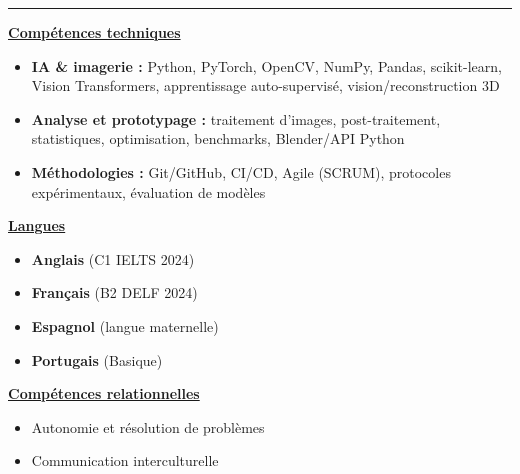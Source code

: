 \documentclass[letterpaper,10pt]{article}
\begin{document}
  

\vspace{4pt}
\noindent\rule{\textwidth}{0.4pt}
\vspace{0.4pt}

\noindent
\begin{minipage}[t]{0.39\textwidth}
  \raggedright
  \textbf{\underline{Compétences techniques}}\\[-2pt]
  {\scriptsize
    \begin{itemize}[leftmargin=*,itemsep=1pt,parsep=0pt,topsep=0pt,partopsep=0pt]
      \item \textbf{IA \& imagerie :} Python, PyTorch, OpenCV, NumPy, Pandas, scikit-learn, Vision Transformers, apprentissage auto-supervisé, vision/reconstruction 3D
      \item \textbf{Analyse et prototypage :} traitement d'images, post-traitement, statistiques, optimisation, benchmarks, Blender/API Python
      \item \textbf{Méthodologies :} Git/GitHub, CI/CD, Agile (SCRUM), protocoles expérimentaux, évaluation de modèles
    \end{itemize}
  }
\end{minipage}\hfill
\begin{minipage}[t]{0.28\textwidth}
  \raggedright
  \textbf{\underline{Langues}}\\[-2pt]
  {\scriptsize
    \begin{itemize}[leftmargin=*,itemsep=0pt,parsep=0pt,topsep=0pt,partopsep=0pt]
      \item \textbf{Anglais} (C1 \textendash{} IELTS 2024)
      \item \textbf{Français} (B2 \textendash{} DELF 2024)
      \item \textbf{Espagnol} (langue maternelle)
      \item \textbf{Portugais} (Basique)
    \end{itemize}
  }

  \vspace{0.12cm}
  \textbf{\underline{Compétences relationnelles}}\\[-2pt]
  {\scriptsize
    \begin{itemize}[leftmargin=*,itemsep=1pt,parsep=0pt,topsep=0pt,partopsep=0pt]
      \item Autonomie et résolution de problèmes
      \item Communication interculturelle
    \end{itemize}
  }
\end{minipage}\hfill
\end{document}
